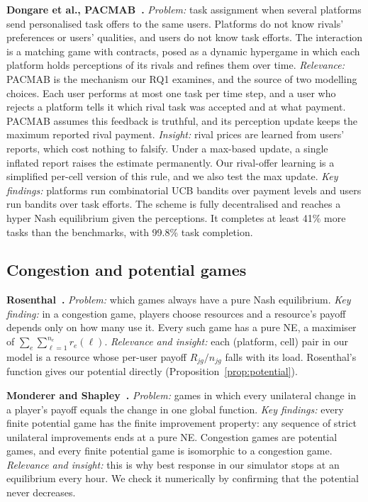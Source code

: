 \documentclass[12pt,draftcls,onecolumn]{IEEEtran}
\begin{document}
\textbf{Dongare et al., PACMAB~\cite{dongare2026pacmab}.}
\emph{Problem:} task assignment when several platforms send personalised task offers to the same users. Platforms do not know rivals' preferences or users' qualities, and users do not know task efforts. The interaction is a matching game with contracts, posed as a dynamic hypergame in which each platform holds perceptions of its rivals and refines them over time.
\emph{Relevance:} PACMAB is the mechanism our RQ1 examines, and the source of two modelling choices. Each user performs at most one task per time step, and a user who rejects a platform tells it which rival task was accepted and at what payment. PACMAB assumes this feedback is truthful, and its perception update keeps the maximum reported rival payment.
\emph{Insight:} rival prices are learned from users' reports, which cost nothing to falsify. Under a max-based update, a single inflated report raises the estimate permanently. Our rival-offer learning is a simplified per-cell version of this rule, and we also test the max update.
\emph{Key findings:} platforms run combinatorial UCB bandits over payment levels and users run bandits over task efforts. The scheme is fully decentralised and reaches a hyper Nash equilibrium given the perceptions. It completes at least 41\% more tasks than the benchmarks, with 99.8\% task completion.

\subsection{Congestion and potential games}
\textbf{Rosenthal~\cite{rosenthal1973}.}
\emph{Problem:} which games always have a pure Nash equilibrium.
\emph{Key finding:} in a congestion game, players choose resources and a resource's payoff depends only on how many use it. Every such game has a pure NE, a maximiser of $\sum_e\sum_{\ell=1}^{n_e}r_e(\ell)$.
\emph{Relevance and insight:} each (platform, cell) pair in our model is a resource whose per-user payoff $R_{jg}/n_{jg}$ falls with its load. Rosenthal's function gives our potential directly (Proposition~\ref{prop:potential}).

\textbf{Monderer and Shapley~\cite{monderer1996potential}.}
\emph{Problem:} games in which every unilateral change in a player's payoff equals the change in one global function.
\emph{Key findings:} every finite potential game has the finite improvement property: any sequence of strict unilateral improvements ends at a pure NE. Congestion games are potential games, and every finite potential game is isomorphic to a congestion game.
\emph{Relevance and insight:} this is why best response in our simulator stops at an equilibrium every hour. We check it numerically by confirming that the potential never decreases.
\end{document}
